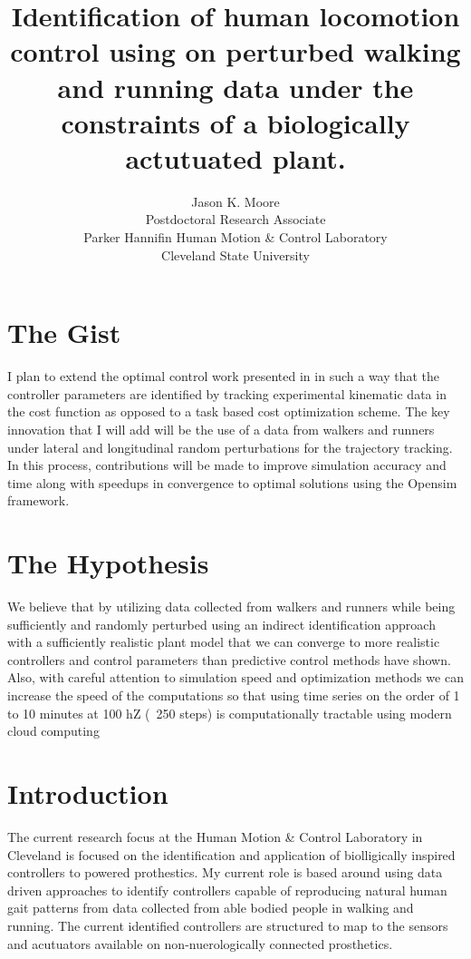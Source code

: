 \documentclass[11pt]{article}
\title{Identification of human locomotion control using on perturbed walking
and running data under the constraints of a biologically actutuated plant.}
\author{Jason K. Moore\\
  Postdoctoral Research Associate\\
  Parker Hannifin Human Motion \& Control Laboratory\\
  Cleveland State University
}
\begin{document}
\maketitle

\section{The Gist}

I plan to extend the optimal control work presented in \cite{Wang2012} in such
a way that the controller parameters are identified by tracking experimental
kinematic data in the cost function as opposed to a task based cost
optimization scheme. The key innovation that I will add will be the use of a
data from walkers and runners under lateral and longitudinal random
perturbations for the trajectory tracking. In this process, contributions will
be made to improve simulation accuracy and time along with speedups in
convergence to optimal solutions using the Opensim framework.

\section{The Hypothesis}

We believe that by utilizing data collected from walkers and runners while
being sufficiently and randomly perturbed using an indirect identification
approach with a sufficiently realistic plant model that we can converge to more
realistic controllers and control parameters than predictive control methods
have shown. Also, with careful attention to simulation speed and optimization
methods we can increase the speed of the computations so that using time series
on the order of 1 to 10 minutes at 100 hZ (~250 steps) is computationally
tractable using modern cloud computing

\section{Introduction}

The current research focus at the Human Motion \& Control Laboratory in
Cleveland is focused on the identification and application of biolligically
inspired controllers to powered prothestics. My current role is based around
using data driven approaches to identify controllers capable of reproducing
natural human gait patterns from data collected from able bodied people in
walking and running. The current identified controllers are structured to map
to the sensors and acutuators available on non-nuerologically connected
prosthetics.
\end{document}
